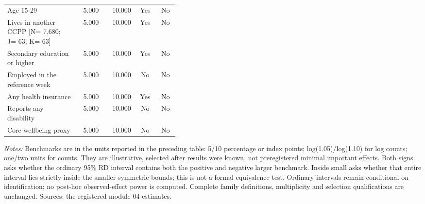 \begin{longtable}{@{}p{0.41\linewidth}rrcc@{}}
Age 15-29 &  5.000 & 10.000 & Yes & No \\
Lives in another CCPP [N=    7,680; J=       63; K=       63] &  5.000 & 10.000 & Yes & No \\
Secondary education or higher &  5.000 & 10.000 & Yes & No \\
Employed in the reference week &  5.000 & 10.000 & No & No \\
Any health insurance &  5.000 & 10.000 & Yes & No \\
Reports any disability &  5.000 & 10.000 & No & No \\
Core wellbeing proxy &  5.000 & 10.000 & No & No \\
\end{longtable}
\noindent\footnotesize\textit{Notes:} Benchmarks are in the units reported in the preceding table: 5/10 percentage or index points; log(1.05)/log(1.10) for log counts; one/two units for counts. They are illustrative, selected after results were known, not preregistered minimal important effects. Both signs asks whether the ordinary 95\% RD interval contains both the positive and negative larger benchmark. Inside small asks whether that entire interval lies strictly inside the smaller symmetric bounds; this is not a formal equivalence test. Ordinary intervals remain conditional on identification; no post-hoc observed-effect power is computed. Complete family definitions, multiplicity and selection qualifications are unchanged. Sources: the registered module-04 estimates.\normalsize

